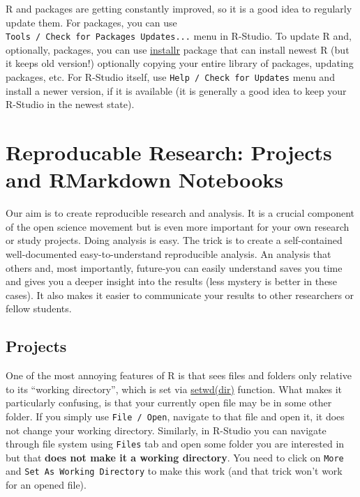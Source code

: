 \documentclass[
]{book}
\begin{document}
R and packages are getting constantly improved, so it is a good idea to regularly update them. For packages, you can use \texttt{Tools\ /\ Check\ for\ Packages\ Updates...} menu in R-Studio. To update R and, optionally, packages, you can use \href{https://www.r-project.org/nosvn/pandoc/installr.html}{installr} package that can install newest R (but it keeps old version!) optionally copying your entire library of packages, updating packages, etc. For R-Studio itself, use \texttt{Help\ /\ Check\ for\ Updates} menu and install a newer version, if it is available (it is generally a good idea to keep your R-Studio in the newest state).

\hypertarget{reproducable-research}{%
\chapter{Reproducable Research: Projects and RMarkdown Notebooks}\label{reproducable-research}}

Our aim is to create reproducible research and analysis. It is a crucial component of the open science movement but is even more important for your own research or study projects. Doing analysis is easy. The trick is to create a self-contained well-documented easy-to-understand reproducible analysis. An analysis that others and, most importantly, future-you can easily understand saves you time and gives you a deeper insight into the results (less mystery is better in these cases). It also makes it easier to communicate your results to other researchers or fellow students.

\hypertarget{projects}{%
\section{Projects}\label{projects}}

One of the most annoying features of R is that sees files and folders only relative to its ``working directory'', which is set via \href{https://www.rdocumentation.org/packages/base/versions/3.6.2/topics/getwd}{setwd(dir)} function. What makes it particularly confusing, is that your currently open file may be in some other folder. If you simply use \texttt{File\ /\ Open}, navigate to that file and open it, it does not change your working directory. Similarly, in R-Studio you can navigate through file system using \texttt{Files} tab and open some folder you are interested in but that \textbf{does not make it a working directory}. You need to click on \texttt{More} and \texttt{Set\ As\ Working\ Directory} to make this work (and that trick won't work for an opened file).
\end{document}

